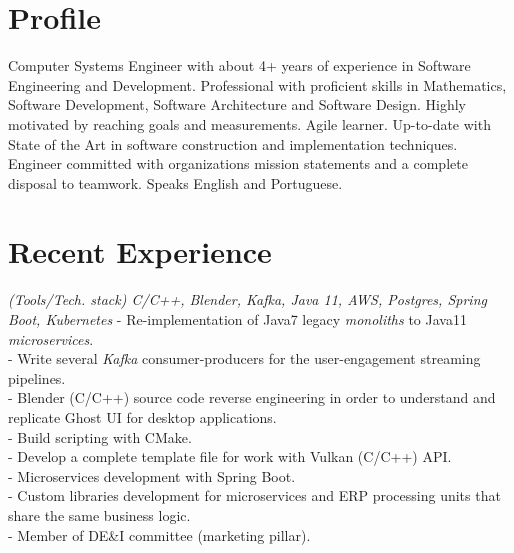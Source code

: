 \documentclass[]{CV-JuanCamiloFlorez}
\begin{document}
\begin{minipage}[t]{0.66\textwidth} 


\section{Profile}
Computer Systems Engineer with about 4+ years of experience in Software Engineering and Development. Professional with proficient skills in Mathematics, Software Development, Software Architecture and Software Design. Highly motivated by reaching goals and measurements. Agile learner. Up-to-date with State of the Art in software construction and implementation techniques. Engineer committed with organizations mission statements and a complete disposal to teamwork. Speaks English and Portuguese.


\sectionsep

\section{Recent Experience}
    \textit{(Tools/Tech. stack) C/C++, Blender, Kafka, Java 11, AWS, Postgres, Spring Boot, Kubernetes}
        - Re-implementation of Java7 legacy \textit{monoliths} to Java11 \textit{microservices}. \\
        - Write several \textit{Kafka} consumer-producers for the user-engagement streaming pipelines. \\
        - Blender (C/C++) source code reverse engineering in order to understand and replicate Ghost UI for desktop applications. \\
        - Build scripting with CMake. \\
        - Develop a complete template file for work with Vulkan (C/C++) API. \\
        - Microservices development with Spring Boot. \\
        - Custom libraries development for microservices and ERP processing units that share the same business logic. \\
        - Member of DE\&I committee (marketing pillar). \\
        \sectionsep


\end{minipage}
\end{document}
